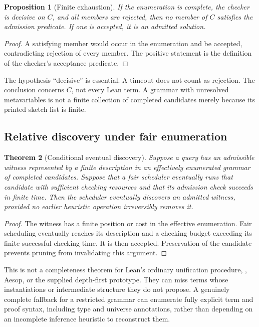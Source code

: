 \documentclass[11pt,letterpaper]{article}
\newcommand{\code}[1]{\texttt{\detokenize{#1}}}
\newtheorem{theorem}{Theorem}[section]
\newtheorem{proposition}[theorem]{Proposition}
\theoremstyle{definition}\newtheorem{definition}[theorem]{Definition}
\theoremstyle{remark}\newtheorem{remark}[theorem]{Remark}
\begin{document}
\begin{proposition}[Finite exhaustion]
If the enumeration is complete, the checker is decisive on $C$, and all members
are rejected, then no member of $C$ satisfies the admission predicate. If one is
accepted, it is an admitted solution.
\end{proposition}
\begin{proof}
A satisfying member would occur in the enumeration and be accepted, contradicting
rejection of every member. The positive statement is the definition of the
checker's acceptance predicate.
\end{proof}

The hypothesis ``decisive'' is essential. A timeout does not count as rejection.
The conclusion concerns $C$, not every Lean term. A grammar with unresolved
metavariables is not a finite collection of completed candidates merely because
its printed sketch list is finite.

\subsection{Relative discovery under fair enumeration}

\begin{theorem}[Conditional eventual discovery]
Suppose a query has an admissible witness represented by a finite description in
an effectively enumerated grammar of completed candidates. Suppose that a fair
scheduler eventually runs that candidate with sufficient checking resources and
that its admission check succeeds in finite time. Then the scheduler eventually
discovers an admitted witness, provided no earlier heuristic operation
irreversibly removes it.
\end{theorem}
\begin{proof}
The witness has a finite position or cost in the effective enumeration. Fair
scheduling eventually reaches its description and a checking budget exceeding
its finite successful checking time. It is then accepted. Preservation of the
candidate prevents pruning from invalidating this argument.
\end{proof}

This is not a completeness theorem for Lean's ordinary unification procedure,
\code{apply}, Aesop, or the supplied depth-first prototype. They can miss terms
whose instantiations or intermediate structure they do not propose. A genuinely
complete fallback for a restricted grammar can enumerate fully explicit term
and proof syntax, including type and universe annotations, rather than depending
on an incomplete inference heuristic to reconstruct them.
\end{document}
